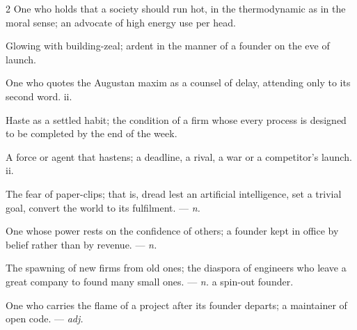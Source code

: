 \begin{multicols}{2}
 One who holds that a society should run hot, in the thermodynamic as in the moral sense; an advocate of high energy use per head.

 Glowing with building-zeal; ardent in the manner of a founder on the eve of launch.

 One who quotes the Augustan maxim as a counsel of delay, attending only to its second word.   ii.

 Haste as a settled habit; the condition of a firm whose every process is designed to be completed by the end of the week.

 A force or agent that hastens; a deadline, a rival, a war or a competitor's launch.   ii.

 The fear of paper-clips; that is, dread lest an artificial intelligence, set a trivial goal, convert the world to its fulfilment.   —  \textit{n.}

 One whose power rests on the confidence of others; a founder kept in office by belief rather than by revenue. —  \textit{n.} 

 The spawning of new firms from old ones; the diaspora of engineers who leave a great company to found many small ones.   —  \textit{n.} a spin-out founder.

 One who carries the flame of a project after its founder departs; a maintainer of open code.  —  \textit{adj.}


\end{multicols}
